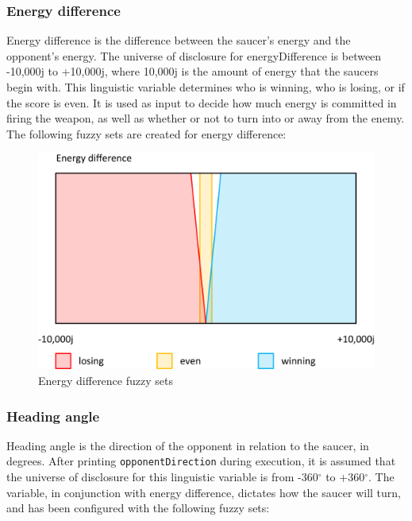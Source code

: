 \subsubsection{Energy difference}

Energy difference is the difference between the saucer's energy and the opponent's energy. The universe of disclosure for energyDifference is between -10,000j to +10,000j, where 10,000j is the amount of energy that the saucers begin with. This linguistic variable determines who is winning, who is losing, or if the score is even. It is used as input to decide how much energy is committed in firing the weapon, as well as whether or not to turn into or away from the enemy. The following fuzzy sets are created for energy difference:

\begin{figure}[H]
\centering
\caption{Energy difference fuzzy sets}
\includegraphics[scale=0.1]{./img/pdf/energyDiffSets.pdf}
\end{figure}

\subsubsection{Heading angle}

Heading angle is the direction of the opponent in relation to the saucer, in degrees. After printing \texttt{opponentDirection} during execution, it is assumed that the universe of disclosure for this linguistic variable is from -360$^{\circ}$ to +360$^{\circ}$. The variable, in conjunction with energy difference, dictates how the saucer will turn, and has been configured with the following fuzzy sets:

